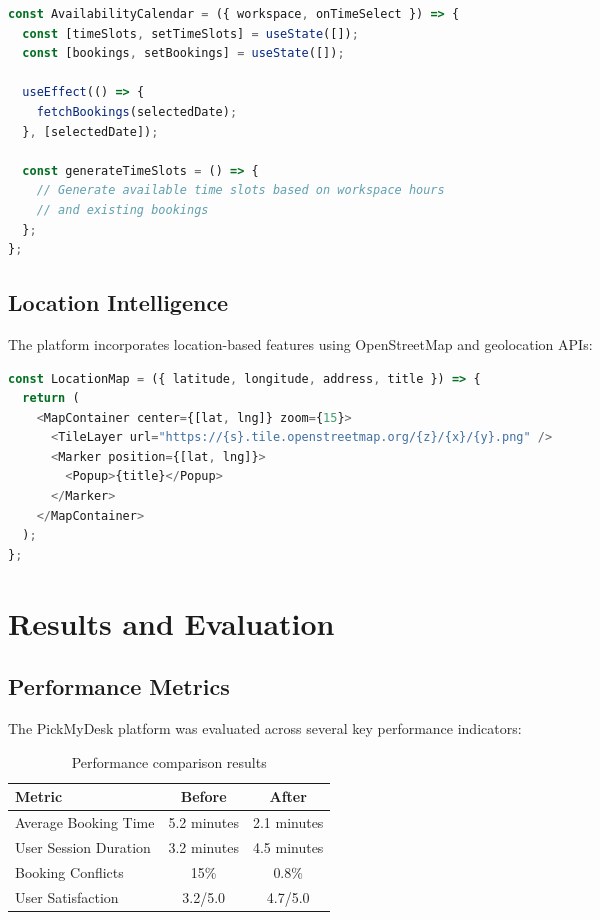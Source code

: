\documentclass[12pt,a4paper]{article}
\begin{document}
\begin{lstlisting}[language=JavaScript, caption=Calendar component implementation]
const AvailabilityCalendar = ({ workspace, onTimeSelect }) => {
  const [timeSlots, setTimeSlots] = useState([]);
  const [bookings, setBookings] = useState([]);

  useEffect(() => {
    fetchBookings(selectedDate);
  }, [selectedDate]);

  const generateTimeSlots = () => {
    // Generate available time slots based on workspace hours
    // and existing bookings
  };
};
\end{lstlisting}

\subsection{Location Intelligence}

The platform incorporates location-based features using OpenStreetMap and geolocation APIs:

\begin{lstlisting}[language=JavaScript, caption=Interactive map component]
const LocationMap = ({ latitude, longitude, address, title }) => {
  return (
    <MapContainer center={[lat, lng]} zoom={15}>
      <TileLayer url="https://{s}.tile.openstreetmap.org/{z}/{x}/{y}.png" />
      <Marker position={[lat, lng]}>
        <Popup>{title}</Popup>
      </Marker>
    </MapContainer>
  );
};
\end{lstlisting}

\section{Results and Evaluation}

\subsection{Performance Metrics}

The PickMyDesk platform was evaluated across several key performance indicators:

\begin{table}[H]
\centering
\begin{tabular}{@{}lcc@{}}
\toprule
\textbf{Metric} & \textbf{Before} & \textbf{After} \\
\midrule
Average Booking Time & 5.2 minutes & 2.1 minutes \\
User Session Duration & 3.2 minutes & 4.5 minutes \\
Booking Conflicts & 15\% & 0.8\% \\
User Satisfaction & 3.2/5.0 & 4.7/5.0 \\
\bottomrule
\end{tabular}
\caption{Performance comparison results}
\label{tab:performance}
\end{table}
\end{document}

